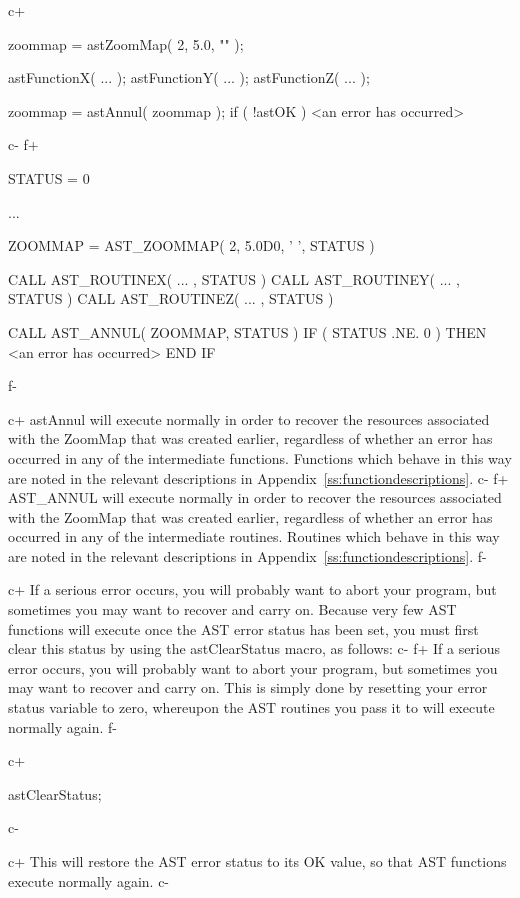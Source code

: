 \documentclass[twoside,11pt]{starlink}
\providecommand{\appref}[1]{Appendix~\ref{#1}}
\begin{document}
c+
\small
\begin{terminalv}
zoommap = astZoomMap( 2, 5.0, "" );

astFunctionX( ... );
astFunctionY( ... );
astFunctionZ( ... );

zoommap = astAnnul( zoommap );
if ( !astOK ) {
   <an error has occurred>
}
\end{terminalv}
\normalsize
c-
f+
\small
\begin{terminalv}
      STATUS = 0

      ...

      ZOOMMAP = AST_ZOOMMAP( 2, 5.0D0, ' ', STATUS )

      CALL AST_ROUTINEX( ... , STATUS )
      CALL AST_ROUTINEY( ... , STATUS )
      CALL AST_ROUTINEZ( ... , STATUS )

      CALL AST_ANNUL( ZOOMMAP, STATUS )
      IF ( STATUS .NE. 0 ) THEN
         <an error has occurred>
      END IF
\end{terminalv}
\normalsize
f-

c+
astAnnul will execute normally in order to recover the resources
associated with the ZoomMap that was created earlier, regardless of
whether an error has occurred in any of the intermediate functions.
Functions which behave in this way are noted in the relevant
descriptions in \appref{ss:functiondescriptions}.
c-
f+
AST\_ANNUL will execute normally in order to recover the resources
associated with the ZoomMap that was created earlier, regardless of
whether an error has occurred in any of the intermediate routines.
Routines which behave in this way are noted in the relevant
descriptions in \appref{ss:functiondescriptions}.
f-

c+
If a serious error occurs, you will probably want to abort your
program, but sometimes you may want to recover and carry on. Because
very few AST functions will execute once the AST error status has been
set, you must first clear this status by using the astClearStatus
macro, as follows:
c-
f+
If a serious error occurs, you will probably want to abort your
program, but sometimes you may want to recover and carry on.  This is
simply done by resetting your error status variable to zero, whereupon
the AST routines you pass it to will execute normally again.
f-

c+
\small
\begin{terminalv}
astClearStatus;
\end{terminalv}
\normalsize
c-

c+
This will restore the AST error status to its OK value, so that AST
functions execute normally again.
c-
\end{document}

